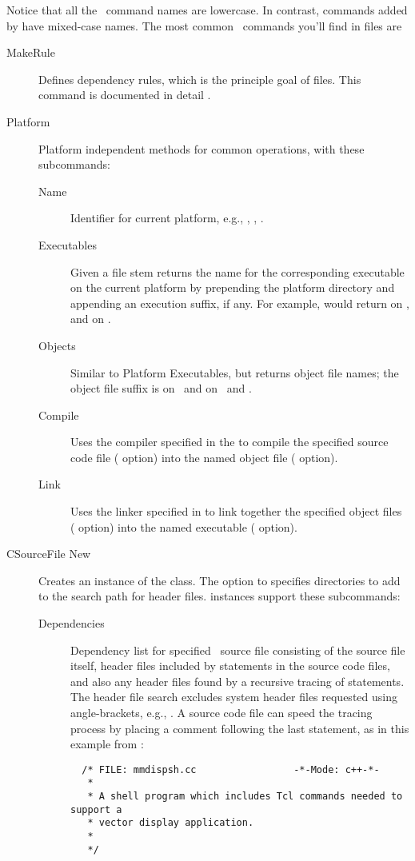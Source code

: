 Notice that all the \Tcl\ command names are lowercase.  In contrast,
commands added by  have mixed-case names. The most common
\OOMMF\ commands you'll find in  files are
\begin{description}
\item[MakeRule] Defines dependency rules, which is the principle goal
  of  files. This command is documented in detail
  .
\item[Platform] Platform independent methods for common operations, with
  these subcommands:
\begin{description}
\item[Name] Identifier for current platform, e.g.,
  , , .
\item[Executables] Given a file stem returns the name for the
  corresponding executable on the current platform by prepending the
  platform directory and appending an execution suffix, if any. For
  example,  would return
   on \Windows, and
   on \Linux.
\item[Objects] Similar to Platform Executables, but returns object file
  names; the object file suffix is  on \Windows\ and  on
  \Linux\ and \MacOSX.
\item[Compile] Uses the compiler specified in the
  to compile the specified
 source code file ( option) into the named object file (
 option).
\item[Link] Uses the linker specified in
  to link together the specified
 object files ( option) into the named executable (
 option).
\end{description}
\item[CSourceFile New] Creates an instance of the 
  class. The  option to  specifies directories to add
  to the search path for header files.  instances
  support these subcommands:
  \begin{description}
  \item[Dependencies] Dependency list for specified \Cplusplus\ source
    file consisting of the source file itself, header files included by
     statements in the source code files, and also any
    header files found by a recursive tracing of 
    statements.  The header file search excludes system header files
    requested using angle-brackets, e.g., . A
    source code file can speed the tracing process by placing a  comment following the last 
    statement, as in this example from
    :
\begin{verbatim}
  /* FILE: mmdispsh.cc                 -*-Mode: c++-*-
   *
   * A shell program which includes Tcl commands needed to support a
   * vector display application.
   *
   */


\end{verbatim}
\end{description}
\end{description}
